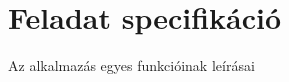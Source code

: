 \section{Feladat specifikáció}\label{sec:feladat-specifikacio}

Az alkalmazás egyes funkcióinak leírásai